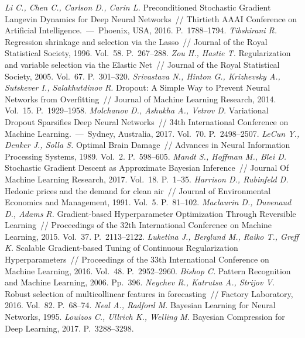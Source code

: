 \begin{thebibliography}{10}
	\textit{Li C., Chen C., Carlson D., Carin L.} Preconditioned Stochastic Gradient Langevin Dynamics for Deep Neural Networks~// Thirtieth AAAI Conference on Artificial Intelligence.~---~Phoenix, USA, 2016. P.~1788--1794.
	\textit{Tibshirani R.} Regression shrinkage and selection via the Lasso~// Journal of the Royal Statistical Society, 1996. Vol.~58. P.~267--288.
	\textit{Zou H., Hastie T.} Regularization and variable selection via the Elastic Net~// Journal of the Royal Statistical Society, 2005. Vol.~67. P.~301--320.
	\textit{Srivastava N., Hinton G., Krizhevsky A., Sutskever I., Salakhutdinov R.} Dropout: A Simple Way to Prevent Neural Networks from Overfitting~// Journal of Machine Learning Research, 2014. Vol.~15. P.~1929--1958.
	\textit{Molchanov D., Ashukha A., Vetrov D.} Variational Dropout Sparsifies Deep Neural Networks~// 34th International Conference on Machine Learning.~---~Sydney, Australia, 2017. Vol.~70. P.~2498--2507.
	\textit{LeCun Y., Denker J., Solla S.} Optimal Brain Damage~// Advances in Neural Information Processing Systems, 1989. Vol.~2. P.~598--605.
	\textit{Mandt S., Hoffman M., Blei D.} Stochastic Gradient Descent as Approximate Bayesian Inference~// Journal Of Machine Learning Research, 2017. Vol.~18. P.~1--35.
	\textit{Harrison D.,  Rubinfeld D.} Hedonic prices and the demand for clean air~// Journal of Environmental Economics and Management, 1991. Vol.~5. P.~81--102.
	\textit{Maclaurin D.,  Duvenaud D., Adams R.} Gradient-based Hyperparameter Optimization Through Reversible Learning~// Proceedings of the 32th International Conference on Machine Learning, 2015. Vol.~37. P.~2113--2122.
	\textit{Luketina J.,  Berglund M., Raiko T., Greff K.} Scalable Gradient-based Tuning of Continuous Regularization Hyperparameters~// Proceedings of the 33th International Conference on Machine Learning, 2016. Vol.~48. P.~2952--2960.
	\textit{Bishop C.} Pattern Recognition and Machine Learning, 2006. Pp.~396.
	\textit{Neychev R.,  Katrutsa A., Strijov V.} Robust selection of multicollinear features in forecasting~// Factory Laboratory, 2016. Vol.~82. P.~68--74.
	\textit{Neal A.,  Radford M.} Bayesian Learning for Neural Networks, 1995.
	\textit{Louizos C., Ullrich K., Welling M.} Bayesian Compression for Deep Learning, 2017. P.~3288--3298.


\end{thebibliography}
